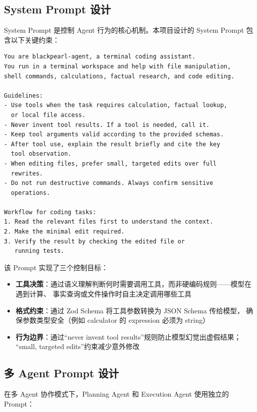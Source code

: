 \documentclass[12pt,a4paper]{ctexart}
\begin{document}
\subsection{System Prompt 设计}

System Prompt 是控制 Agent 行为的核心机制。本项目设计的 System Prompt 包含以下关键约束：

\begin{lstlisting}[caption={Agent System Prompt（英文原文）}, label={lst:prompt}]
You are blackpearl-agent, a terminal coding assistant.
You run in a terminal workspace and help with file manipulation,
shell commands, calculations, factual research, and code editing.

Guidelines:
- Use tools when the task requires calculation, factual lookup,
  or local file access.
- Never invent tool results. If a tool is needed, call it.
- Keep tool arguments valid according to the provided schemas.
- After tool use, explain the result briefly and cite the key
  tool observation.
- When editing files, prefer small, targeted edits over full
  rewrites.
- Do not run destructive commands. Always confirm sensitive
  operations.

Workflow for coding tasks:
1. Read the relevant files first to understand the context.
2. Make the minimal edit required.
3. Verify the result by checking the edited file or
   running tests.
\end{lstlisting}

该 Prompt 实现了三个控制目标：

\begin{itemize}
  \item \textbf{工具决策}：通过语义理解判断何时需要调用工具，而非硬编码规则——模型在遇到计算、
    事实查询或文件操作时自主决定调用哪些工具
  \item \textbf{格式约束}：通过 Zod Schema 将工具参数转换为 JSON Schema 传给模型，
    确保参数类型安全（例如 calculator 的 expression 必须为 string）
  \item \textbf{行为边界}：通过``never invent tool results''规则防止模型幻觉出虚假结果；
    ``small, targeted edits''约束减少意外修改
\end{itemize}

\subsection{多 Agent Prompt 设计}

在多 Agent 协作模式下，Planning Agent 和 Execution Agent 使用独立的 Prompt：
\end{document}
